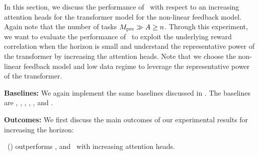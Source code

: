 In this section, we discuss the performance of \pred\ with respect to an increasing attention heads for the transformer model for the non-linear feedback model. Again note that the number of tasks $M_{\text{pre}} \gg A \geq n$.
%
%
Through this experiment, we want to evaluate the performance of \pred\ to exploit the underlying reward correlation when the horizon is small and understand the representative power of the transformer by increasing the attention heads.
%
Note that we choose the non-linear feedback model and low data regime to leverage the representative power of the transformer.


\textbf{Baselines:} We again implement the same baselines discussed in . The baselines are \pred, \predt, \dptg, \ad, \ts, and \linucb. 


\textbf{Outcomes:} We first discuss the main outcomes of our experimental results for increasing the horizon:




\begin{tcolorbox}
\customfinding \pred\ (\gt) outperforms \dptg, and \ad\ with increasing attention heads.
\end{tcolorbox}

